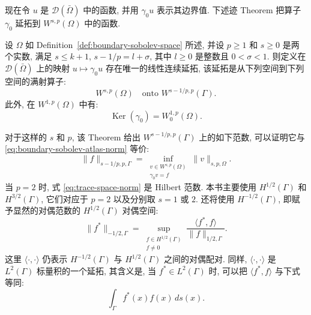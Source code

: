 现在令 $u$ 是 $\mathcal D(\bar\Omega)$ 中的函数, 并用 $\gamma_0u$ 表示其边界值. 下述迹 Theorem
把算子 $\gamma_0$ 延拓到 $W^{s,p}(\Omega)$ 中的函数.

\setcounter{statement}{4}
\renewcommand{\theHstatement}{theorem.\thesection.\arabic{statement}}
\begin{Theorem}\label{thm:trace-operator}
设 $\Omega$ 如 Definition~\ref{def:boundary-sobolev-space} 所述, 并设 $p\geq1$ 和 $s\geq0$ 是两个实数,
满足 $s\leq k+1$, $s-1/p=l+\sigma$, 其中 $l\geq0$ 是整数且 $0<\sigma<1$. 则定义在
$\mathcal D(\bar\Omega)$ 上的映射 $u\mapsto\gamma_0u$ 存在唯一的线性连续延拓, 该延拓是从下列空间到下列空间的满射算子:
\[
W^{s,p}(\Omega)\quad\text{onto }W^{s-1/p,p}(\Gamma).
\]
此外, 在 $W^{1,p}(\Omega)$ 中有:
\[
\operatorname{Ker}(\gamma_0)=W_0^{1,p}(\Omega).
\]
\end{Theorem}

对于这样的 $s$ 和 $p$, 该 Theorem 给出 $W^{s-1/p,p}(\Gamma)$ 上的如下范数, 可以证明它与
\eqref{eq:boundary-sobolev-atlas-norm} 等价:
\begin{equation}\label{eq:trace-space-norm}
\|f\|_{s-1/p,p,\Gamma}=
\inf_{\substack{v\in W^{s,p}(\Omega)\\\gamma_0v=f}}
\|v\|_{s,p,\Omega}.
\end{equation}
当 $p=2$ 时, 式 \eqref{eq:trace-space-norm} 是 Hilbert 范数. 本书主要使用 $H^{1/2}(\Gamma)$ 和
$H^{3/2}(\Gamma)$, 它们对应于 $p=2$ 以及分别取 $s=1$ 或 $2$. 还将使用 $H^{-1/2}(\Gamma)$,
即赋予显然的对偶范数的 $H^{1/2}(\Gamma)$ 对偶空间:
\begin{equation}\label{eq:boundary-negative-half-norm}
\|f^*\|_{-1/2,\Gamma}=
\sup_{\substack{f\in H^{1/2}(\Gamma)\\f\neq0}}
\frac{\langle f^*,f\rangle}{\|f\|_{1/2,\Gamma}}.
\end{equation}
这里 $\langle\cdot,\cdot\rangle$ 仍表示 $H^{-1/2}(\Gamma)$ 与 $H^{1/2}(\Gamma)$ 之间的对偶配对.
同样, $\langle\cdot,\cdot\rangle$ 是 $L^2(\Gamma)$ 标量积的一个延拓, 其含义是, 当
$f^*\in L^2(\Gamma)$ 时, 可以把 $\langle f^*,f\rangle$ 与下式等同:
\[
\int_\Gamma f^*(x)f(x)\,ds(x).
\]
